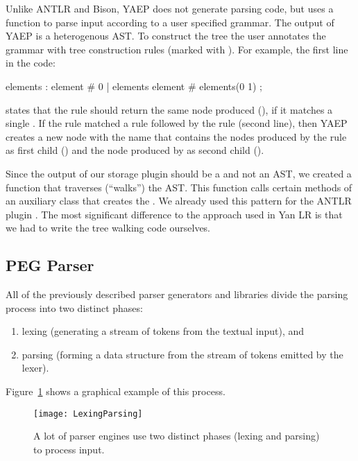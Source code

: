 Unlike \gls{ANTLR} and Bison, \gls{YAEP} does not generate parsing code, but uses a function to parse input according to a user specified grammar. The output of YAEP is a heterogenous \gls{AST}. To construct the tree the user annotates the grammar with tree construction rules (marked with \code{\#}). For example, the first line in the code:

\begin{shellcode}
elements : element          # 0
         | elements element # elements(0 1)
         ;
\end{shellcode}

states that the rule  should return the same node  produced (), if it matches a single . If the rule  matched a rule  followed by the rule  (second line), then YAEP creates a new node with the name  that contains the nodes produced by the rule  as first child () and the node produced by  as second child ().

Since the output of our storage plugin \LinkYAwn{} should be a  and not an \gls{AST}, we created a function that traverses (“walks”) the \gls{AST}. This function calls certain methods of an auxiliary class  that creates the . We already used this pattern for the \gls{ANTLR} plugin \LinkYanLR{}. The most significant difference to the approach used in Yan LR is that we had to write the tree walking code ourselves.

\subsection{PEG Parser}
\label{sec:peg_parser}

All of the previously described parser generators and libraries divide the parsing process into two distinct phases:

\begin{enumerate}
  \item lexing (generating a stream of \glspl{token} from the textual input), and
  \item parsing (forming a data structure from the stream of \glspl{token} emitted by the lexer).
\end{enumerate}

Figure~\ref{fig:lexing_parsing} shows a graphical example of this process.

\begin{figure}
  \centering
    \texttt{[image: LexingParsing]}
  \caption{A lot of parser engines use two distinct phases (lexing and parsing) to process input.}
  \label{fig:lexing_parsing}
\end{figure}

